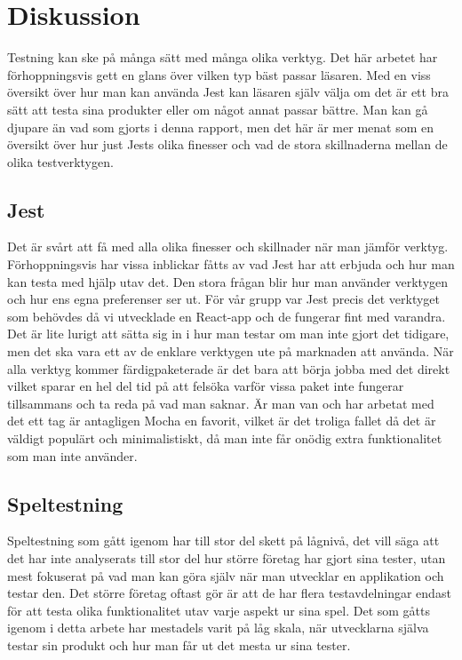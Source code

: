 \section{Diskussion}
\label{sec:david-discussion}
Testning kan ske på många sätt med många olika verktyg. Det här arbetet har förhoppningsvis gett en glans över vilken typ bäst passar läsaren. Med en viss översikt över hur man kan använda Jest kan läsaren själv välja om det är ett bra sätt att testa sina produkter eller om något annat passar bättre. Man kan gå djupare än vad som gjorts i denna rapport, men det här är mer menat som en översikt över hur just Jests olika finesser och vad de stora skillnaderna mellan de olika testverktygen.

\subsection{Jest} 
\label{subsec:david-discussion-jest}
Det är svårt att få med alla olika finesser och skillnader när man jämför verktyg. Förhoppningsvis har vissa inblickar fåtts av vad Jest har att erbjuda och hur man kan testa med hjälp utav det. Den stora frågan blir hur man använder verktygen och hur ens egna preferenser ser ut. För vår grupp var Jest precis det verktyget som behövdes då vi utvecklade en React-app och de fungerar fint med varandra. Det är lite lurigt att sätta sig in i hur man testar om man inte gjort det tidigare, men det ska vara ett av de enklare verktygen ute på marknaden att använda.\cite{bib-jest-easy} När alla verktyg kommer färdigpaketerade är det bara att börja jobba med det direkt vilket sparar en hel del tid på att felsöka varför vissa paket inte fungerar tillsammans och ta reda på vad man saknar. Är man van och har arbetat med det ett tag är antagligen Mocha en favorit, vilket är det troliga fallet då det är väldigt populärt och minimalistiskt, då man inte får onödig extra funktionalitet som man inte använder. 

\subsection{Speltestning}
\label{subsec:david-discussion-speltestning}
Speltestning som gått igenom har till stor del skett på lågnivå, det vill säga att det har inte analyserats till stor del hur större företag har gjort sina tester, utan mest fokuserat på vad man kan göra själv när man utvecklar en applikation och testar den. Det större företag oftast gör är att de har flera testavdelningar endast för att testa olika funktionalitet utav varje aspekt ur sina spel. Det som gåtts igenom i detta arbete har mestadels varit på låg skala, när utvecklarna själva testar sin produkt och hur man får ut det mesta ur sina tester. 